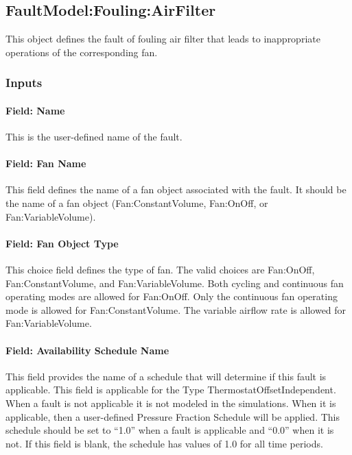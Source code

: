 \subsection{FaultModel:Fouling:AirFilter}\label{faultmodelfoulingairfilter}

This object defines the fault of fouling air filter that leads to inappropriate operations of the corresponding fan.

\subsubsection{Inputs}\label{inputs-8-013}

\paragraph{Field: Name}\label{field-name-8-011}

This is the user-defined name of the fault.

\paragraph{Field: Fan Name}\label{field-fan-name-002}

This field defines the name of a fan object associated with the fault. It should be the name of a fan object (Fan:ConstantVolume, Fan:OnOff, or Fan:VariableVolume).

\paragraph{Field: Fan Object Type}\label{field-fan-object-type-000}

This choice field defines the type of fan. The valid choices are Fan:OnOff, Fan:ConstantVolume, and Fan:VariableVolume. Both cycling and continuous fan operating modes are allowed for Fan:OnOff. Only the continuous fan operating mode is allowed for Fan:ConstantVolume. The variable airflow rate is allowed for Fan:VariableVolume.

\paragraph{Field: Availability Schedule Name}\label{field-availability-schedule-name-8-002}

This field provides the name of a schedule that will determine if this fault is applicable. This field is applicable for the Type ThermostatOffsetIndependent. When a fault is not applicable it is not modeled in the simulations. When it is applicable, then a user-defined Pressure Fraction Schedule will be applied. This schedule should be set to ``1.0'' when a fault is applicable and ``0.0'' when it is not. If this field is blank, the schedule has values of 1.0 for all time periods.

